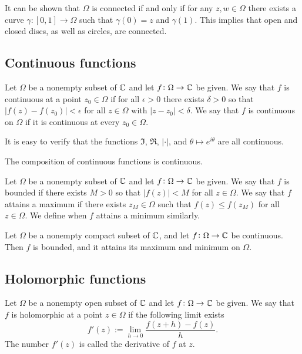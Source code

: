 \documentclass[11pt,a4paper]{article}
\begin{document}
\begin{remark}
    It can be shown that $\Omega$ is connected if and only if for any
    $z, w \in \Omega$ there exists a curve $\gamma \colon [0,1] \to \Omega$
    such that $\gamma(0) = z$ and $\gamma(1)$.
    This implies that open and closed discs, as well as circles, are
    connected.
\end{remark}

\subsection{Continuous functions}

\begin{definition}
    Let $\Omega$ be a nonempty subset of $\mathbb{C}$ and let 
    $f \colon \Omega \to \mathbb{C}$ be given.
    We say that $f$ is continuous at a point $z_0 \in \Omega$ 
    if for all $\epsilon > 0$ there exists $\delta > 0$ so
    that $|f(z) - f(z_0)| < \epsilon$ for all $z \in \Omega$ with 
    $|z - z_0| < \delta$.
    We say that $f$ is continuous on $\Omega$ if it is continuous at every 
    $z_0 \in \Omega$.
\end{definition}

\begin{remark}
    It is easy to verify that the functions $\Im$, $\Re$, $|\cdot|$, and
    $\theta \mapsto e^{i \theta}$ are all continuous.
\end{remark}

\begin{proposition}
    The composition of continuous functions is continuous.
\end{proposition}

\begin{definition}
    Let $\Omega$ be a nonempty subset of $\mathbb{C}$ and let 
    $f \colon \Omega \to \mathbb{C}$ be given.
    We say that $f$ is bounded if there exists $M > 0$ so that 
    $|f(z)| < M$ for all $z \in \Omega$.
    We say that $f$ attains a maximum if there exists $z_M \in \Omega$
    such that $f(z) \le f(z_M)$ for all $z \in \Omega$.
    We define when $f$ attains a minimum similarly.
\end{definition}

\begin{proposition}
    Let $\Omega$ be a nonempty compact subset of $\mathbb{C}$, and let 
    $f \colon \Omega \to \mathbb{C}$ be continuous.
    Then $f$ is bounded, and it attains its maximum and minimum on $\Omega$.
\end{proposition}

\subsection{Holomorphic functions}

\begin{definition}
    Let $\Omega$ be a nonempty open subset of $\mathbb{C}$ and let 
    $f \colon \Omega \to \mathbb{C}$ be given.
    We say that $f$ is holomorphic at a point $z \in \Omega$
    if the following limit exists
    \[
        f'(z) := \lim_{h \to 0} \frac{f(z + h) - f(z)}{h}.
    \]
    The number $f'(z)$ is called the derivative of $f$ at $z$.
\end{definition}
\end{document}
